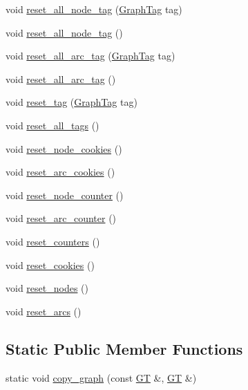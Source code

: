 \begin{DoxyCompactItemize}
void \hyperlink{class_designar_1_1_base_graph_a07ca1909d77210157b8b9571a4d35d6c}{reset\+\_\+all\+\_\+node\+\_\+tag} (\hyperlink{namespace_designar_ac91366256ea6ea6ac5fd483d55a7499e}{Graph\+Tag} tag)
\item 
void \hyperlink{class_designar_1_1_base_graph_a7bffa4f055b15f76d12bd7c40730a3dd}{reset\+\_\+all\+\_\+node\+\_\+tag} ()
\item 
void \hyperlink{class_designar_1_1_base_graph_ab73705a167e91d0982a9f149b1d7e71b}{reset\+\_\+all\+\_\+arc\+\_\+tag} (\hyperlink{namespace_designar_ac91366256ea6ea6ac5fd483d55a7499e}{Graph\+Tag} tag)
\item 
void \hyperlink{class_designar_1_1_base_graph_af9ae2a4dfd676090de4b4fa04414989c}{reset\+\_\+all\+\_\+arc\+\_\+tag} ()
\item 
void \hyperlink{class_designar_1_1_base_graph_ae8845b2eb9d33f62684c8e5acc7c91b7}{reset\+\_\+tag} (\hyperlink{namespace_designar_ac91366256ea6ea6ac5fd483d55a7499e}{Graph\+Tag} tag)
\item 
void \hyperlink{class_designar_1_1_base_graph_ae62e72668468a2aaa3ddc91246e1ee1c}{reset\+\_\+all\+\_\+tags} ()
\item 
void \hyperlink{class_designar_1_1_base_graph_ab797f80e7efa5a6d0b33f925d6079c18}{reset\+\_\+node\+\_\+cookies} ()
\item 
void \hyperlink{class_designar_1_1_base_graph_a44b6cefb8966ed69a0d80bfe7e4546cb}{reset\+\_\+arc\+\_\+cookies} ()
\item 
void \hyperlink{class_designar_1_1_base_graph_a53603f64b51b470cc6b8c8d6d2b643a4}{reset\+\_\+node\+\_\+counter} ()
\item 
void \hyperlink{class_designar_1_1_base_graph_a8b22e29aa37006fab9c219de86660bdd}{reset\+\_\+arc\+\_\+counter} ()
\item 
void \hyperlink{class_designar_1_1_base_graph_a881c342d8f25d43f995ccfdf876622e1}{reset\+\_\+counters} ()
\item 
void \hyperlink{class_designar_1_1_base_graph_a96a630fd589c34e7e6242f4349606e1c}{reset\+\_\+cookies} ()
\item 
void \hyperlink{class_designar_1_1_base_graph_a1b21c48fed41f36ad4158d718f837c89}{reset\+\_\+nodes} ()
\item 
void \hyperlink{class_designar_1_1_base_graph_a6dc66191c2d752bf7f67a4522a7830e3}{reset\+\_\+arcs} ()
\end{DoxyCompactItemize}
\subsection*{Static Public Member Functions}
\begin{DoxyCompactItemize}
\item 
static void \hyperlink{class_designar_1_1_base_graph_ac34a3b513973c2ed43067934f71ace28}{copy\+\_\+graph} (const \hyperlink{demo-buildgraph_8_c_a3001c40d2c31ca87ed96cd7d1334a55e}{GT} \&, \hyperlink{demo-buildgraph_8_c_a3001c40d2c31ca87ed96cd7d1334a55e}{GT} \&)
\end{DoxyCompactItemize}


